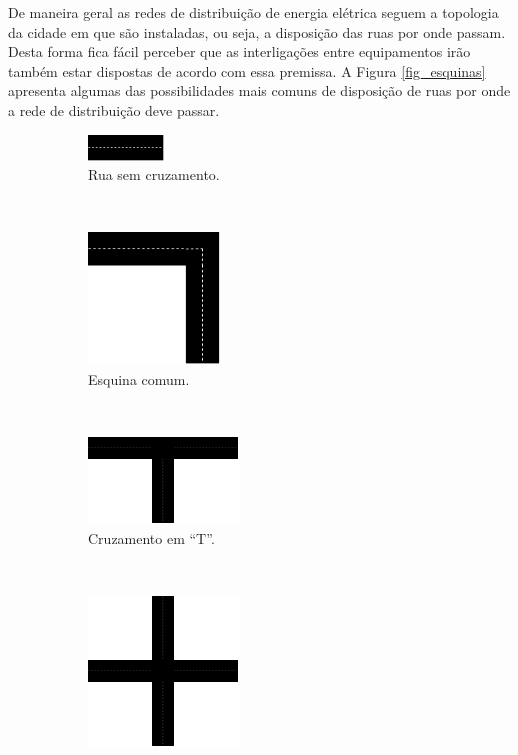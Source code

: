 De maneira geral as redes de distribuição de energia elétrica seguem a topologia da cidade em que são instaladas, ou seja, a disposição das ruas por onde passam. Desta forma fica fácil perceber que as interligações entre equipamentos irão também estar dispostas de acordo com essa premissa. A Figura \ref{fig_esquinas} apresenta algumas das possibilidades mais comuns de disposição de ruas por onde a rede de distribuição deve passar.

\begin{figure}[t!]
	\centering
	\begin{subfigure}[t]{0.4\textwidth}
		\centering
		\includegraphics[width=2cm]{./figuras/esquinas1.png} %
		\caption{Rua sem cruzamento.}
		\label{fig_esquinas1}
	\end{subfigure}%
	~
	\begin{subfigure}[t]{0.4\textwidth}
		\centering
		\includegraphics[width=3.5cm]{./figuras/esquinas2.png} %
	\caption{Esquina comum.}
	\label{fig_esquinas2}
	\end{subfigure}
	~
	\begin{subfigure}[t]{0.4\textwidth}
		\centering
		\includegraphics[width=4cm]{./figuras/esquinas3.png} %
	\caption{Cruzamento em ``T''.}
	\label{fig_esquinas3}
	\end{subfigure}
	~
	\begin{subfigure}[t]{0.4\textwidth}
		\centering
		\includegraphics[width=4cm]{./figuras/esquinas4.png} %

\end{subfigure}
\end{figure}
